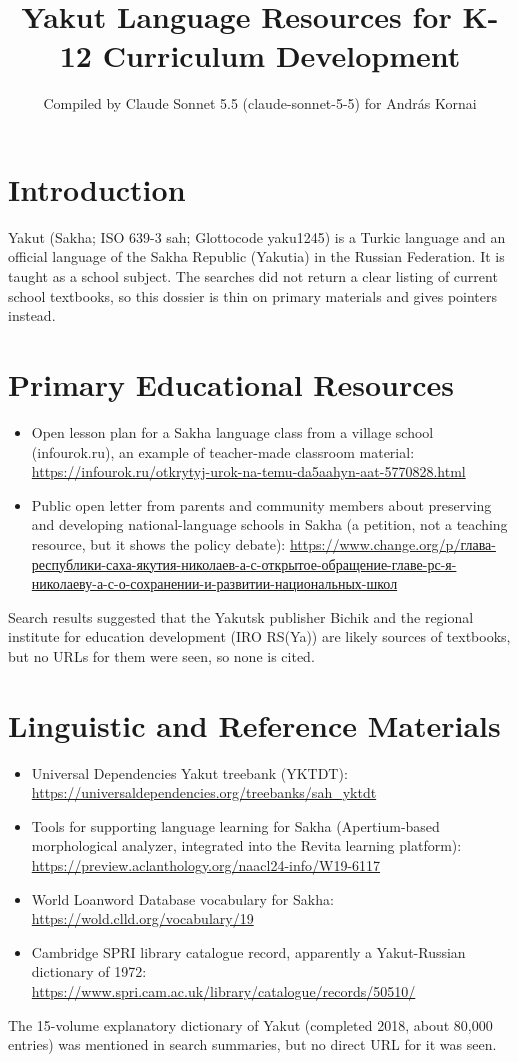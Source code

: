 \documentclass[12pt]{article}
\title{Yakut Language Resources for K-12 Curriculum Development}
\author{Compiled by Claude Sonnet 5.5 (claude-sonnet-5-5) for Andr\'as Kornai}
\date{}
\begin{document}
\maketitle

\section{Introduction}
Yakut (Sakha; ISO 639-3 sah; Glottocode yaku1245) is a Turkic language and an official language of the Sakha Republic (Yakutia) in the Russian Federation. It is taught as a school subject. The searches did not return a clear listing of current school textbooks, so this dossier is thin on primary materials and gives pointers instead.

\section{Primary Educational Resources}
\begin{itemize}
\item Open lesson plan for a Sakha language class from a village school (infourok.ru), an example of teacher-made classroom material: \url{https://infourok.ru/otkrytyj-urok-na-temu-da5aahyn-aat-5770828.html}
\item Public open letter from parents and community members about preserving and developing national-language schools in Sakha (a petition, not a teaching resource, but it shows the policy debate): \url{https://www.change.org/p/глава-республики-саха-якутия-николаев-а-с-открытое-обращение-главе-рс-я-николаеву-а-с-о-сохранении-и-развитии-национальных-школ}
\end{itemize}
Search results suggested that the Yakutsk publisher Bichik and the regional institute for education development (IRO RS(Ya)) are likely sources of textbooks, but no URLs for them were seen, so none is cited.

\section{Linguistic and Reference Materials}
\begin{itemize}
\item Universal Dependencies Yakut treebank (YKTDT): \url{https://universaldependencies.org/treebanks/sah_yktdt}
\item Tools for supporting language learning for Sakha (Apertium-based morphological analyzer, integrated into the Revita learning platform): \url{https://preview.aclanthology.org/naacl24-info/W19-6117}
\item World Loanword Database vocabulary for Sakha: \url{https://wold.clld.org/vocabulary/19}
\item Cambridge SPRI library catalogue record, apparently a Yakut-Russian dictionary of 1972: \url{https://www.spri.cam.ac.uk/library/catalogue/records/50510/}
\end{itemize}
The 15-volume explanatory dictionary of Yakut (completed 2018, about 80,000 entries) was mentioned in search summaries, but no direct URL for it was seen.
\end{document}
